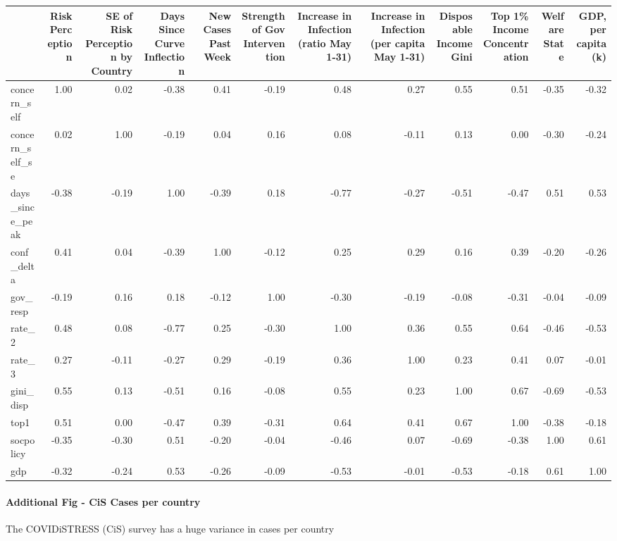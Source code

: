 \documentclass[
]{article}
\begin{document}
\begin{table}[H]
\centering
\begin{tabular}{l|r|r|r|r|r|r|r|r|r|r|r}
\hline
  & Risk Perception & SE of Risk Perception by Country & Days Since Curve Inflection & New Cases Past Week & Strength of Gov Intervention & Increase in Infection (ratio May 1-31) & Increase in Infection (per capita May 1-31) & Disposable Income Gini & Top 1\% Income Concentration & Welfare State & GDP, per capita (k)\\
\hline
concern\_self & 1.00 & 0.02 & -0.38 & 0.41 & -0.19 & 0.48 & 0.27 & 0.55 & 0.51 & -0.35 & -0.32\\
\hline
concern\_self\_se & 0.02 & 1.00 & -0.19 & 0.04 & 0.16 & 0.08 & -0.11 & 0.13 & 0.00 & -0.30 & -0.24\\
\hline
days\_since\_peak & -0.38 & -0.19 & 1.00 & -0.39 & 0.18 & -0.77 & -0.27 & -0.51 & -0.47 & 0.51 & 0.53\\
\hline
conf\_delta & 0.41 & 0.04 & -0.39 & 1.00 & -0.12 & 0.25 & 0.29 & 0.16 & 0.39 & -0.20 & -0.26\\
\hline
gov\_resp & -0.19 & 0.16 & 0.18 & -0.12 & 1.00 & -0.30 & -0.19 & -0.08 & -0.31 & -0.04 & -0.09\\
\hline
rate\_2 & 0.48 & 0.08 & -0.77 & 0.25 & -0.30 & 1.00 & 0.36 & 0.55 & 0.64 & -0.46 & -0.53\\
\hline
rate\_3 & 0.27 & -0.11 & -0.27 & 0.29 & -0.19 & 0.36 & 1.00 & 0.23 & 0.41 & 0.07 & -0.01\\
\hline
gini\_disp & 0.55 & 0.13 & -0.51 & 0.16 & -0.08 & 0.55 & 0.23 & 1.00 & 0.67 & -0.69 & -0.53\\
\hline
top1 & 0.51 & 0.00 & -0.47 & 0.39 & -0.31 & 0.64 & 0.41 & 0.67 & 1.00 & -0.38 & -0.18\\
\hline
socpolicy & -0.35 & -0.30 & 0.51 & -0.20 & -0.04 & -0.46 & 0.07 & -0.69 & -0.38 & 1.00 & 0.61\\
\hline
gdp & -0.32 & -0.24 & 0.53 & -0.26 & -0.09 & -0.53 & -0.01 & -0.53 & -0.18 & 0.61 & 1.00\\
\hline
\end{tabular}
\end{table}

\hypertarget{additional-fig---cis-cases-per-country}{%
\paragraph{Additional Fig - CiS Cases per
country}\label{additional-fig---cis-cases-per-country}}

The COVIDiSTRESS (CiS) survey has a huge variance in cases per country
\end{document}
